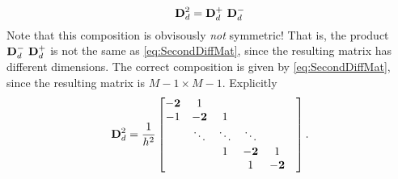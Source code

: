 \begin{equation}\label{eq:SecondDiffMat}
{\bf D}^2_d = {\bf D}^+_d \,\, {\bf D}^-_d
\end{equation}
Note that this composition is obvisously \emph{not} symmetric! That is, the product ${\bf D}^-_d \,\, {\bf D}^+_d$ is not the same as \eqref{eq:SecondDiffMat}, since the resulting matrix has different dimensions. The correct composition is given by \eqref{eq:SecondDiffMat}, since the resulting matrix is $M-1 \times M-1$. Explicitly
\begin{equation}\label{eq:D2Diri}
{\bf D}^2_d = \frac{1}{h^2}\begin{bmatrix}
{\bf -2}& 1&   &  &  &  \\ 
-1& {\bf -2} & 1 &  &  &\\
& \ddots & \ddots & \ddots &  &      \\
& &  1 & {\bf -2}& 1   \\
& &   & 1 & {\bf -2}   \\
\end{bmatrix}.
\end{equation}

